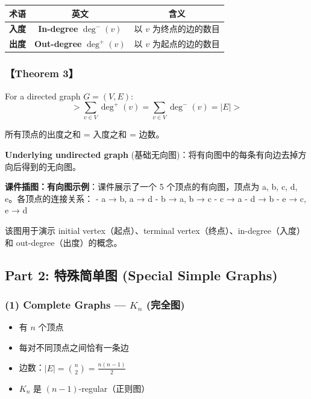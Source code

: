 \documentclass[10pt,a4paper,openany]{ctexbook}
\theoremstyle{definition}
\theoremstyle{remark}
\renewenvironment{quote}
  {\list{}{\leftmargin=1em\rightmargin=0pt\topsep=0.5pt\partopsep=0pt}\item[]}
  {\endlist}
\begin{document}
\begin{center}
\begin{tabular}{ccc}
\hline
术语 & 英文 & 含义 \\ \hline
\textbf{入度} & \textbf{In-degree} $\deg^-(v)$ & 以 $v$ 为终点的边的数目 \\
\textbf{出度} & \textbf{Out-degree} $\deg^+(v)$ & 以 $v$ 为起点的边的数目 \\
\hline
\end{tabular}

\end{center}

\subsubsection{【Theorem 3】}

\begin{quote}
For a directed graph $G = (V, E)$:
\[
> \sum_{v \in V} \deg^+(v) = \sum_{v \in V} \deg^-(v) = |E|
> 
\]

所有顶点的出度之和 = 入度之和 = 边数。

\textbf{Underlying undirected graph} (基础无向图)：将有向图中的每条有向边去掉方向后得到的无向图。

\textbf{课件插图：有向图示例}：课件展示了一个 5 个顶点的有向图，顶点为 a, b, c, d, e。各顶点的连接关系：
- a → b, a → d
- b → a, b → c
- c → a
- d → b
- e → c, e → d

该图用于演示 initial vertex（起点）、terminal vertex（终点）、in-degree（入度）和 out-degree（出度）的概念。

\end{quote}
\vspace{-2pt}

\subsection{Part 2: 特殊简单图 (Special Simple Graphs)}

\subsubsection{(1) Complete Graphs — $K_n$ (完全图)}

\begin{itemize}
\item 有 $n$ 个顶点
\item 每对不同顶点之间恰有一条边
\item 边数：$\displaystyle |E| = \binom{n}{2} = \frac{n(n-1)}{2}$
\item $K_n$ 是 $(n-1)$-regular（正则图）

\end{itemize}
\end{document}
